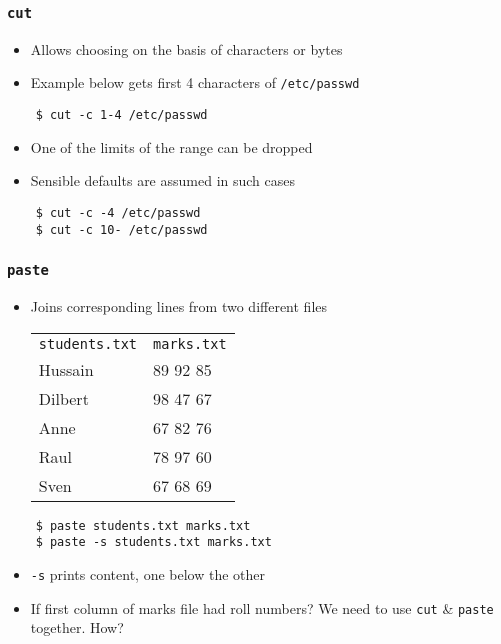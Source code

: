 \documentclass[12pt,compress]{beamer}
\begin{document}
\begin{frame}[fragile]
  \frametitle{\texttt{cut}}
  \begin{itemize}
  \item Allows choosing on the basis of characters or bytes
  \item Example below gets first 4 characters of \texttt{/etc/passwd}
  \end{itemize}
  \begin{lstlisting}
    $ cut -c 1-4 /etc/passwd
  \end{lstlisting} %
  \begin{itemize}
  \item One of the limits of the range can be dropped
  \item Sensible defaults are assumed in such cases
  \end{itemize}
  \begin{lstlisting}
    $ cut -c -4 /etc/passwd
    $ cut -c 10- /etc/passwd
  \end{lstlisting} %
\end{frame}

\begin{frame}[fragile]
  \frametitle{\texttt{paste}}
  \begin{itemize}
  \item Joins corresponding lines from two different files
    \begin{center}
      \begin{tabular}{l|l}
        \verb~students.txt~  &  \verb~marks.txt~  \\
        Hussain              &  89 92 85          \\
        Dilbert              &  98 47 67          \\
        Anne                 &  67 82 76          \\
        Raul                 &  78 97 60          \\
        Sven                 &  67 68 69          \\
      \end{tabular}
    \end{center}
  \end{itemize}
  \begin{lstlisting}
    $ paste students.txt marks.txt 
    $ paste -s students.txt marks.txt
  \end{lstlisting}
  \begin{itemize}
  \item \texttt{-s} prints content, one below the other
  \item If first column of marks file had roll numbers? We need to use
    \texttt{cut} \& \texttt{paste} together. How?
  \end{itemize}
\end{frame}
\end{document}
